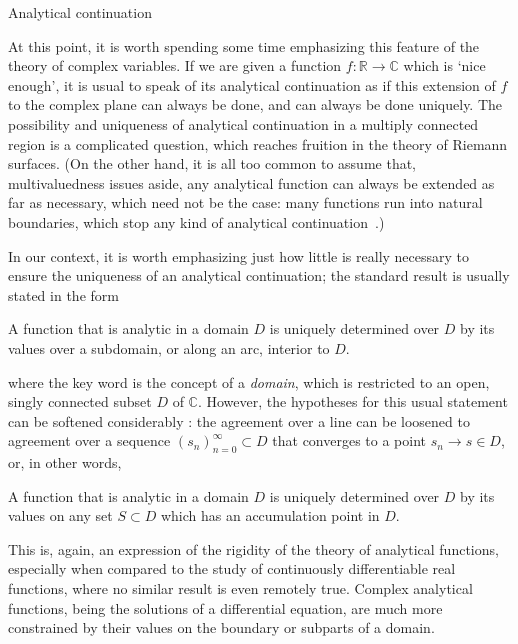 \begin{mathaside}{Analytical continuation}
\label{aside.analytical-continuation}

At this point, it is worth spending some time emphasizing this feature of the theory of complex variables. If we are given a function $f:\mathbb{R}\to \mathbb{C}$ which is `nice enough', it is usual to speak of its analytical continuation as if this extension of $f$ to the complex plane can always be done, and can always be done uniquely. The possibility and uniqueness of analytical continuation in a multiply connected region is a complicated question, which reaches fruition in the theory of Riemann surfaces. (On the other hand, it is all too common to assume that, multivaluedness issues aside, any analytical function can always be extended as far as necessary, which need not be the case: many functions run into natural boundaries, which stop any kind of analytical continuation~\cite[p.~191]{noguchi_complex_analysis}.)

\vspace{\maskip}
In our context, it is worth emphasizing just how little is really necessary to ensure the uniqueness of an analytical continuation; the standard result \cite[given e.g. in Ref.][pp.~283ff]{churchill_complex_variables} is usually stated in the form

\begin{theorem}
A function that is analytic in a domain $D$ is uniquely determined over $D$ by its values over a subdomain, or along an arc, interior to $D$.
\end{theorem}


where the key word is the concept of a \textit{domain}, which is restricted to an open, singly connected subset $D$ of $\mathbb{C}$. However, the hypotheses for this usual statement can be softened considerably \cite[p.~95]{noguchi_complex_analysis}: the agreement over a line can be loosened to agreement over a sequence $(s_n)_{n=0}^\infty \subset D$ that converges to a point $s_n\to s\in D$, or, in other words,

\begin{theorem}
A function that is analytic in a domain $D$ is uniquely determined over $D$ by its values on any set $S\subset D$ which has an accumulation point in $D$.
\end{theorem}


This is, again, an expression of the rigidity of the theory of analytical functions, especially when compared to the study of continuously differentiable real functions, where no similar result is even remotely true. Complex analytical functions, being the solutions of a differential equation, are much more constrained by their values on the boundary or subparts of a domain.

\end{mathaside}




